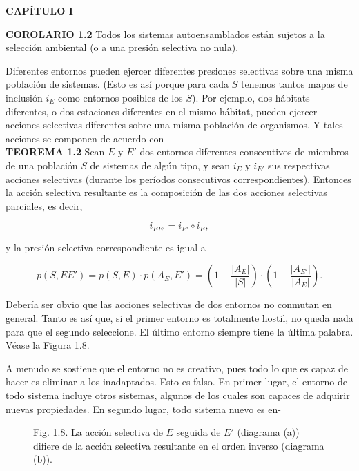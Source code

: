\newpage
\fancyhf{}
\fancyhead[l]{\thepage}
\begin{center}
{\fontsize{13}{16}\selectfont \textbf{CAPÍTULO I}}
\end{center}
\vspace{0.5cm}

{\fontsize{13}{15}\selectfont
\textbf{COROLARIO 1.2} Todos los sistemas autoensamblados están sujetos a la selección ambiental (o a una presión selectiva no nula).

Diferentes entornos pueden ejercer diferentes presiones selectivas sobre una misma población de sistemas. (Esto es así porque para cada \( S \) tenemos tantos mapas de inclusión \( i_E \) como entornos posibles de los \( S \)). Por ejemplo, dos hábitats diferentes, o dos estaciones diferentes en el mismo hábitat, 
pueden ejercer acciones selectivas diferentes sobre una misma población de organismos. Y tales acciones se componen de acuerdo con \\

\textbf{TEOREMA 1.2} Sean \( E \) y \( E' \) dos entornos diferentes consecutivos de miembros de una población \( S \) de sistemas de algún tipo, y sean \( i_E \) y \( i_{E'} \) sus respectivas acciones selectivas (durante los períodos consecutivos correspondientes). Entonces la acción selectiva resultante es la composición de las dos acciones selectivas parciales, es decir,

\[i_{EE'} = i_{E'} \circ i_E,\]

y la presión selectiva correspondiente es igual a

\[p(S, EE') = p(S, E) \cdot p(A_E, E') = \left( 1 - \frac{|A_E|}{|S|} \right) \cdot \left( 1 - \frac{|A_{E'}|}{|A_E|} \right).\]

Debería ser obvio que las acciones selectivas de dos entornos no conmutan en general. Tanto es así que, si el primer entorno es totalmente hostil, no queda nada para que el segundo seleccione. El último entorno siempre tiene la última palabra. Véase la Figura 1.8.

A menudo se sostiene que el entorno no es creativo, pues todo lo que es capaz de hacer es eliminar a los inadaptados. Esto es falso. En primer lugar, el entorno de todo sistema incluye otros sistemas, algunos de los cuales son capaces de adquirir nuevas propiedades. En segundo lugar, todo sistema nuevo es en-
}

\begin{figure}[h!]
    \centering
    \caption*{Fig. 1.8. La acción selectiva de \( E \) seguida de \( E' \) (diagrama (a)) difiere de la acción selectiva resultante en el orden inverso (diagrama (b)).}
\end{figure}

